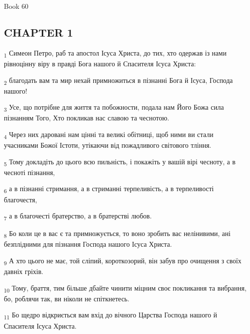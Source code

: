 Book 60
\subsection{CHAPTER 1}
\begin{tcolorbox}
\textsubscript{1} Симеон Петро, раб та апостол Ісуса Христа, до тих, хто одержав із нами рівноцінну віру в правді Бога нашого й Спасителя Ісуса Христа:
\end{tcolorbox}
\begin{tcolorbox}
\textsubscript{2} благодать вам та мир нехай примножиться в пізнанні Бога й Ісуса, Господа нашого!
\end{tcolorbox}
\begin{tcolorbox}
\textsubscript{3} Усе, що потрібне для життя та побожности, подала нам Його Божа сила пізнанням Того, Хто покликав нас славою та чеснотою.
\end{tcolorbox}
\begin{tcolorbox}
\textsubscript{4} Через них даровані нам цінні та великі обітниці, щоб ними ви стали учасниками Божої Істоти, утікаючи від пожадливого світового тління.
\end{tcolorbox}
\begin{tcolorbox}
\textsubscript{5} Тому докладіть до цього всю пильність, і покажіть у вашій вірі чесноту, а в чесноті пізнання,
\end{tcolorbox}
\begin{tcolorbox}
\textsubscript{6} а в пізнанні стримання, а в стриманні терпеливість, а в терпеливості благочестя,
\end{tcolorbox}
\begin{tcolorbox}
\textsubscript{7} а в благочесті братерство, а в братерстві любов.
\end{tcolorbox}
\begin{tcolorbox}
\textsubscript{8} Бо коли це в вас є та примножується, то воно зробить вас нелінивими, ані безплідними для пізнання Господа нашого Ісуса Христа.
\end{tcolorbox}
\begin{tcolorbox}
\textsubscript{9} А хто цього не має, той сліпий, короткозорий, він забув про очищення з своїх давніх гріхів.
\end{tcolorbox}
\begin{tcolorbox}
\textsubscript{10} Тому, браття, тим більше дбайте чинити міцним своє покликання та вибрання, бо, роблячи так, ви ніколи не спіткнетесь.
\end{tcolorbox}
\begin{tcolorbox}
\textsubscript{11} Бо щедро відкриється вам вхід до вічного Царства Господа нашого й Спасителя Ісуса Христа.
\end{tcolorbox}
